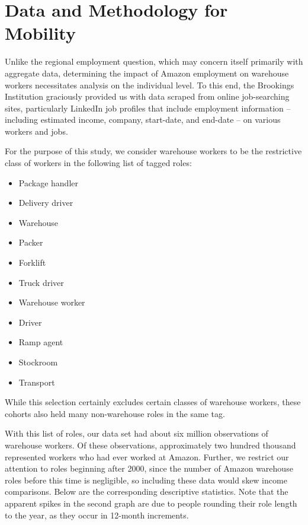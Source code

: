 \documentclass[11pt]{article}
\begin{document}
\clearpage

\section{Data and Methodology for Mobility}

\-\hspace{0.5cm} Unlike the regional employment question, which may  concern itself primarily with aggregate data, determining the impact of Amazon employment on warehouse workers necessitates analysis on the individual level. To this end, the Brookings Institution graciously provided us with data scraped from online job-searching sites, particularly LinkedIn job profiles that include employment information --  including estimated income, company, start-date, and end-date -- on various workers and jobs. 

\-\hspace{0.5cm} For the purpose of this study, we consider warehouse workers to be the restrictive class of workers in the following list of tagged roles:

\begin{multicols}{2}
\begin{itemize}
    \item Package handler
    \item Delivery driver
    \item Warehouse
    \item Packer
    \item Forklift
    \item Truck driver
\end{itemize}

\columnbreak

\begin{itemize}
    \item Warehouse worker
    \item Driver
    \item Ramp agent
    \item Stockroom
    \item Transport
\end{itemize}
\end{multicols}

\-\hspace{0.5cm} While this selection certainly excludes certain classes of warehouse workers, these cohorts also held many non-warehouse roles in the same tag.

\-\hspace{0.5cm} With this list of roles, our data set had about six million observations of warehouse workers. Of these observations, approximately two hundred thousand represented workers who had ever worked at Amazon. Further, we restrict our attention to roles beginning after 2000, since the number of Amazon warehouse roles before this time is negligible, so including these data would skew income comparisons. Below are the corresponding descriptive statistics. Note that the apparent spikes in the second graph are due to people rounding their role length to the year, as they occur in 12-month increments. 
\end{document}

